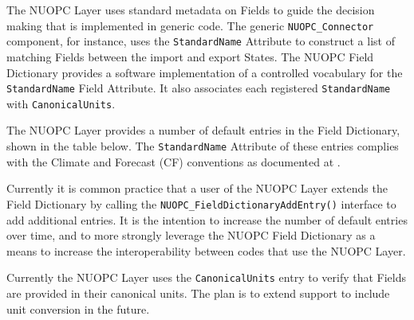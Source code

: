 %

\label{field_dictionary}

The NUOPC Layer uses standard metadata on Fields to guide the decision making that is implemented in generic code. The generic {\tt NUOPC\_Connector} component, for instance, uses the {\tt StandardName} Attribute to construct a list of matching Fields between the import and export States. The NUOPC Field Dictionary provides a software implementation of a controlled vocabulary for the {\tt StandardName} Field Attribute. It also associates each registered {\tt StandardName} with {\tt CanonicalUnits}.

The NUOPC Layer provides a number of default entries in the Field Dictionary, shown in the table below. The {\tt StandardName} Attribute of these entries complies with the Climate and Forecast (CF) conventions as documented at . 

Currently it is common practice that a user of the NUOPC Layer extends the Field Dictionary by calling the {\tt  NUOPC\_FieldDictionaryAddEntry()} interface to add additional entries. It is the intention to increase the number of default entries over time, and to more strongly leverage the NUOPC Field Dictionary as a means to increase the interoperability between codes that use the NUOPC Layer.

Currently the NUOPC Layer uses the {\tt CanonicalUnits} entry to verify that Fields are provided in their canonical units. The plan is to extend support to include unit conversion in the future.
